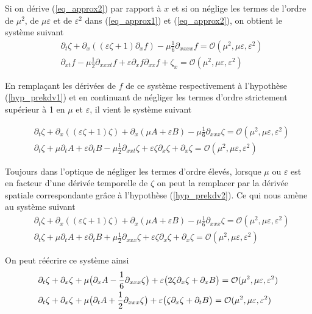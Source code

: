 \documentclass[12pt,a4paper]{article}
\numberwithin{equation}{section}
\begin{document}
Si on dérive (\ref{eq_approx2}) par rapport à $x$ et si on néglige les termes de l'ordre de $\mu^2$, de $\mu\varepsilon$ et de $\varepsilon^2$ dans (\ref{eq_approx1}) et (\ref{eq_approx2}), on obtient le système suivant
\begin{align*}
    &\partial_t\zeta+\partial_x((\varepsilon\zeta + 1)\partial_xf) - \mu\frac{1}{6}\partial_{xxxx}f = \mathcal{O}(\mu^2, \mu\varepsilon, \varepsilon^2)\\
    &\partial_{xt}f - \mu \frac{1}{2}\partial_{xxxt}f + \varepsilon\partial_xf\partial_{xx}f + \zeta_x = \mathcal{O}(\mu^2, \mu\varepsilon, \varepsilon^2)
\end{align*}

En remplaçant les dérivées de $f$ de ce système respectivement à l'hypothèse (\ref{hyp_prekdv1}) et en continuant de négliger les termes d'ordre strictement supérieur à 1 en $\mu$ et $\varepsilon$, il vient le système suivant

\begin{align*}
    &\partial_t\zeta+\partial_x((\varepsilon\zeta + 1)\zeta) + \partial_x(\mu A + \varepsilon B) - \mu\frac{1}{6}\partial_{xxx}\zeta = \mathcal{O}(\mu^2, \mu\varepsilon, \varepsilon^2)\\
    &\partial_t \zeta + \mu\partial_tA+\varepsilon\partial_tB - \mu \frac{1}{2}\partial_{xxt}\zeta + \varepsilon\zeta\partial_{x}\zeta + \partial_x \zeta = \mathcal{O}(\mu^2, \mu\varepsilon, \varepsilon^2)
\end{align*}

Toujours dans l'optique de négliger les termes d'ordre élevés, lorsque $\mu$ ou $\varepsilon$ est en facteur d'une dérivée temporelle de $\zeta$ on peut la remplacer par la dérivée spatiale correspondante grâce à l'hypothèse (\ref{hyp_prekdv2}). Ce qui nous amène au système suivant
\begin{align*}
    &\partial_t\zeta +\partial_x((\varepsilon\zeta + 1)\zeta) + \partial_x(\mu A + \varepsilon B) - \mu\frac{1}{6}\partial_{xxx}\zeta = \mathcal{O}(\mu^2, \mu\varepsilon, \varepsilon^2)\\
    &\partial_t \zeta + \mu\partial_tA+\varepsilon\partial_tB + \mu \frac{1}{2}\partial_{xxx}\zeta + \varepsilon\zeta\partial_{x}\zeta + \partial_x \zeta = \mathcal{O}(\mu^2, \mu\varepsilon, \varepsilon^2)
\end{align*}

On peut réécrire ce système ainsi
\begin{align}
    &\partial_t\zeta + \partial_x\zeta + \mu  \big( \partial_x A - \frac{1}{6}\partial_{xxx}\zeta \big) + \varepsilon  \big( 2\zeta\partial_x\zeta + \partial_x B \big) = \mathcal{O}(\mu^2, \mu\varepsilon, \varepsilon^2) \label{eq_withAandB} \\
    &\partial_t\zeta + \partial_x\zeta + \mu  \big( \partial_t A + \frac{1}{2}\partial_{xxx}\zeta \big) + \varepsilon  \big(  \zeta\partial_x\zeta + \partial_t B \big) = \mathcal{O}(\mu^2, \mu\varepsilon, \varepsilon^2)\notag
\end{align}
\end{document}
